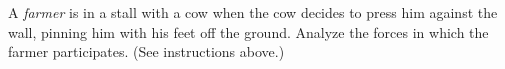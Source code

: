  A \emph{farmer} is in a stall with a cow when the cow
decides to press him against the wall, pinning him with his
feet off the ground. Analyze the forces in which the
farmer participates.
(See instructions above.)
